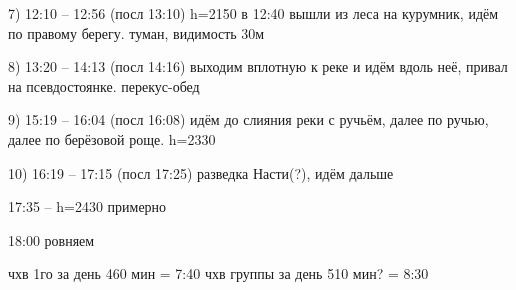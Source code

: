 7) 12:10 -- 12:56 (посл 13:10) h=2150 в 12:40 вышли из леса на курумник, идём по правому берегу. туман, видимость 30м

8) 13:20 -- 14:13 (посл 14:16) выходим вплотную к реке и идём вдоль неё, привал на псевдостоянке. перекус-обед

9) 15:19 -- 16:04 (посл 16:08) идём до слияния реки с ручьём, далее по ручью, далее по берёзовой роще. h=2330

10) 16:19 -- 17:15 (посл 17:25) разведка Насти(?), идём дальше

17:35 -- h=2430 примерно

18:00 ровняем

чхв 1го за день 460 мин = 7:40
чхв группы за день 510 мин? = 8:30


    \FloatBarrier
